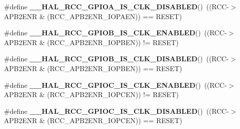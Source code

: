 \begin{DoxyCompactItemize}
\#define {\bfseries \+\_\+\+\_\+\+H\+A\+L\+\_\+\+R\+C\+C\+\_\+\+G\+P\+I\+O\+A\+\_\+\+I\+S\+\_\+\+C\+L\+K\+\_\+\+D\+I\+S\+A\+B\+L\+ED}()~((R\+CC-\/$>$A\+P\+B2\+E\+NR \& (R\+C\+C\+\_\+\+A\+P\+B2\+E\+N\+R\+\_\+\+I\+O\+P\+A\+EN)) == R\+E\+S\+ET)
\item 
\mbox{\label{group___r_c_c___a_p_b2___peripheral___clock___enable___disable___status_ga2fc8f9dc5f5b64c14c325c45ee301b4f}} 
\#define {\bfseries \+\_\+\+\_\+\+H\+A\+L\+\_\+\+R\+C\+C\+\_\+\+G\+P\+I\+O\+B\+\_\+\+I\+S\+\_\+\+C\+L\+K\+\_\+\+E\+N\+A\+B\+L\+ED}()~((R\+CC-\/$>$A\+P\+B2\+E\+NR \& (R\+C\+C\+\_\+\+A\+P\+B2\+E\+N\+R\+\_\+\+I\+O\+P\+B\+EN)) != R\+E\+S\+ET)
\item 
\mbox{\label{group___r_c_c___a_p_b2___peripheral___clock___enable___disable___status_ga9b9353035473ac5f144f6e5385c4bebb}} 
\#define {\bfseries \+\_\+\+\_\+\+H\+A\+L\+\_\+\+R\+C\+C\+\_\+\+G\+P\+I\+O\+B\+\_\+\+I\+S\+\_\+\+C\+L\+K\+\_\+\+D\+I\+S\+A\+B\+L\+ED}()~((R\+CC-\/$>$A\+P\+B2\+E\+NR \& (R\+C\+C\+\_\+\+A\+P\+B2\+E\+N\+R\+\_\+\+I\+O\+P\+B\+EN)) == R\+E\+S\+ET)
\item 
\mbox{\label{group___r_c_c___a_p_b2___peripheral___clock___enable___disable___status_ga528029c120a0154dfd7cfd6159e8debe}} 
\#define {\bfseries \+\_\+\+\_\+\+H\+A\+L\+\_\+\+R\+C\+C\+\_\+\+G\+P\+I\+O\+C\+\_\+\+I\+S\+\_\+\+C\+L\+K\+\_\+\+E\+N\+A\+B\+L\+ED}()~((R\+CC-\/$>$A\+P\+B2\+E\+NR \& (R\+C\+C\+\_\+\+A\+P\+B2\+E\+N\+R\+\_\+\+I\+O\+P\+C\+EN)) != R\+E\+S\+ET)
\item 
\mbox{\label{group___r_c_c___a_p_b2___peripheral___clock___enable___disable___status_ga5e939d98ecca025c028bd1d837b84c81}} 
\#define {\bfseries \+\_\+\+\_\+\+H\+A\+L\+\_\+\+R\+C\+C\+\_\+\+G\+P\+I\+O\+C\+\_\+\+I\+S\+\_\+\+C\+L\+K\+\_\+\+D\+I\+S\+A\+B\+L\+ED}()~((R\+CC-\/$>$A\+P\+B2\+E\+NR \& (R\+C\+C\+\_\+\+A\+P\+B2\+E\+N\+R\+\_\+\+I\+O\+P\+C\+EN)) == R\+E\+S\+ET)
\item 
\mbox{\label{group___r_c_c___a_p_b2___peripheral___clock___enable___disable___status_ga7a8a0e334d69163b25692f0450dc569a}} 

\end{DoxyCompactItemize}
